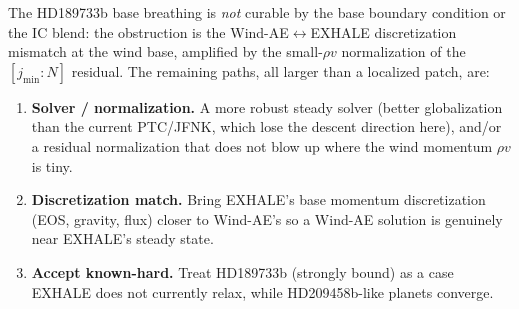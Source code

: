 \documentclass[english,a4paper]{my_memo}
\begin{document}
\medskip
The HD189733b base breathing is \emph{not} curable by the base boundary
condition or the IC blend: the obstruction is the Wind-AE$\leftrightarrow$EXHALE
discretization mismatch at the wind base, amplified by the small-$\rho v$
normalization of the $[j_{\min}:N]$ residual. The remaining paths, all
larger than a localized patch, are:
\begin{enumerate}\itemsep2pt
  \item \textbf{Solver / normalization.} A more robust steady solver
        (better globalization than the current PTC/JFNK, which lose the
        descent direction here), and/or a residual normalization that does
        not blow up where the wind momentum $\rho v$ is tiny.
  \item \textbf{Discretization match.} Bring EXHALE's base momentum
        discretization (EOS, gravity, flux) closer to Wind-AE's so a
        Wind-AE solution is genuinely near EXHALE's steady state.
  \item \textbf{Accept known-hard.} Treat HD189733b (strongly bound) as a
        case EXHALE does not currently relax, while HD209458b-like planets
        converge.
\end{enumerate}
\end{document}

